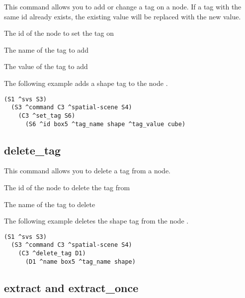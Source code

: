 This command allows you to add or change a tag on a node.
If a tag with the same id already exists,
the existing value will be replaced with the new value.

\begin{description}
	\item{} The id of the node to set the tag on
	\item{} The name of the tag to add
	\item{} The value of the tag to add
\end{description}

The following example adds a shape tag to the node .

\begin{verbatim}
(S1 ^svs S3)
  (S3 ^command C3 ^spatial-scene S4)
    (C3 ^set_tag S6)
      (S6 ^id box5 ^tag_name shape ^tag_value cube)
\end{verbatim}


\subsection{delete\_tag}

This command allows you to delete a tag from a node.

\begin{description}
	\item{} The id of the node to delete the tag from
	\item{} The name of the tag to delete
\end{description}

The following example deletes the shape tag from the node .

\begin{verbatim}
(S1 ^svs S3)
  (S3 ^command C3 ^spatial-scene S4)
    (C3 ^delete_tag D1)
      (D1 ^name box5 ^tag_name shape)
\end{verbatim}


\subsection{extract and extract\_once}

